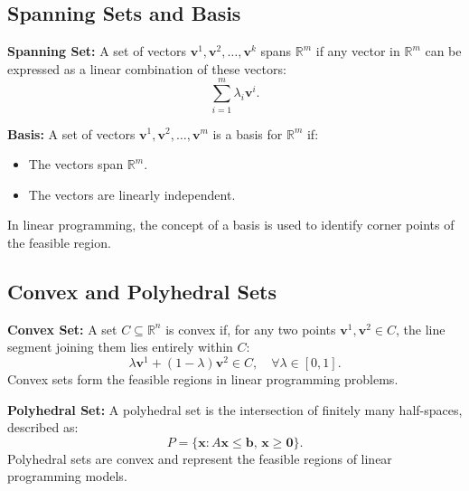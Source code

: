 \subsection{Spanning Sets and Basis}

\textbf{Spanning Set:}  
A set of vectors \(\mathbf{v}^1, \mathbf{v}^2, \dots, \mathbf{v}^k\) spans \(\mathbb{R}^m\) if any vector in \(\mathbb{R}^m\) can be expressed as a linear combination of these vectors:
\[
\sum_{i=1}^m \lambda_i \mathbf{v}^i.
\]

\textbf{Basis:}  
A set of vectors \(\mathbf{v}^1, \mathbf{v}^2, \dots, \mathbf{v}^m\) is a basis for \(\mathbb{R}^m\) if:
\begin{itemize}
    \item The vectors span \(\mathbb{R}^m\).
    \item The vectors are linearly independent.
\end{itemize}
In linear programming, the concept of a basis is used to identify corner points of the feasible region.

\subsection{Convex and Polyhedral Sets}

\textbf{Convex Set:}  
A set \(C \subseteq \mathbb{R}^n\) is convex if, for any two points \(\mathbf{v}^1, \mathbf{v}^2 \in C\), the line segment joining them lies entirely within \(C\):
\[
\lambda \mathbf{v}^1 + (1 - \lambda) \mathbf{v}^2 \in C, \quad \forall \lambda \in [0, 1].
\]
Convex sets form the feasible regions in linear programming problems.

\textbf{Polyhedral Set:}  
A polyhedral set is the intersection of finitely many half-spaces, described as:
\[
P= \{\mathbf{x} : A \mathbf{x} \leq \mathbf{b}, \, \mathbf{x} \geq \mathbf{0}\}.
\]
Polyhedral sets are convex and represent the feasible regions of linear programming models.

